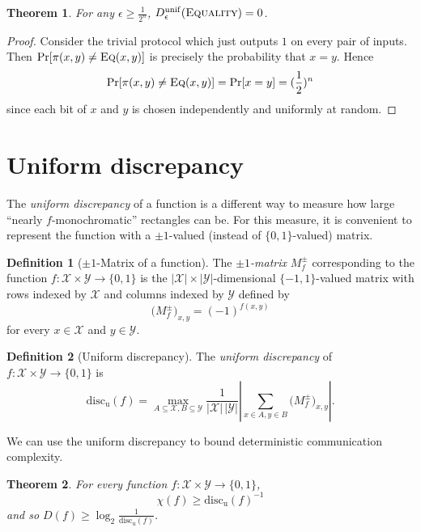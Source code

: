 \documentclass[11pt]{amsart}
\theoremstyle{plain}
\newtheorem{theorem}{Theorem}
\theoremstyle{definition}
\newtheorem{definition}{Definition}
\theoremstyle{plain}
\newcommand{\calX}{\mathcal{X}}
\newcommand{\calY}{\mathcal{Y}}
\newcommand{\discu}{\mathrm{disc_u}}
\newcommand{\Eq}{\textsc{Eq}}
\begin{document}
\begin{theorem}
For any $\epsilon \ge \frac1{2^n}$, $D_\epsilon^{\mathrm{unif}}(\textsc{Equality}) = 0$.
\end{theorem}

\begin{proof}
Consider the trivial protocol which just outputs $1$ on every pair of inputs. Then $\Pr[\pi(x,y)\neq \Eq(x,y)]$ is precisely the probability that $x=y$. Hence
$$\Pr[\pi(x,y)\neq \Eq(x,y)] = \Pr[x=y] = (\frac{1}{2})^n$$
since each bit of $x$ and $y$ is chosen independently and uniformly at random.
\end{proof}


\newpage \section{Uniform discrepancy}

The \emph{uniform discrepancy} of a function is a different way to measure how large ``nearly $f$-monochromatic'' rectangles can be. For this measure, it is convenient to represent the function with a $\pm1$-valued (instead of $\{0,1\}$-valued) matrix.

\begin{definition}[$\pm 1$-Matrix of a function]
The \emph{$\pm 1$-matrix} $M^\pm_f$ corresponding to the function $f : \calX \times \calY \to \{0,1\}$ is the $|\calX| \times |\calY|$-dimensional $\{-1,1\}$-valued matrix with rows indexed by $\calX$ and columns indexed by $\calY$ defined by
\[
\big(M^{\pm}_f\big)_{x,y} = (-1)^{f(x,y)}
\]
for every $x \in \calX$ and $y \in \calY$.
\end{definition}

\begin{definition}[Uniform discrepancy]
The \emph{uniform discrepancy} of $f : \calX \times \calY \to \{0,1\}$ is
\[
\discu(f) = \max_{A \subseteq \calX, B \subseteq \calY} \frac{1}{|\calX| \, |\calY|} \left| \sum_{x \in A, y \in B} \big(M^{\pm}_f\big)_{x,y} \right|.
\]
\end{definition}

We can use the uniform discrepancy to bound deterministic communication complexity.

\begin{theorem}
For every function $f : \calX \times \calY \to \{0,1\}$,
\[
\chi(f) \ge \discu(f)^{-1}
\] 
and so $D(f) \ge \log_2 \frac1{\discu(f)}$.
\end{theorem}
\end{document}
